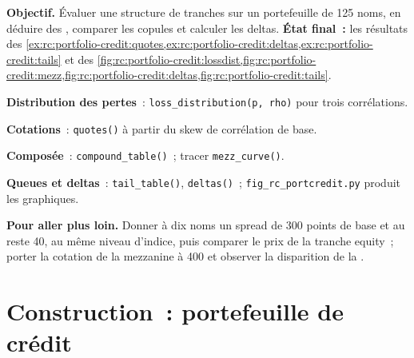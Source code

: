 \begin{tutorial}
\textbf{Objectif.} Évaluer une structure de tranches sur un portefeuille de 125 noms, en déduire des
, comparer les copules et calculer les deltas. \textbf{État final~:} les résultats
des \cref{ex:rc:portfolio-credit:quotes,ex:rc:portfolio-credit:deltas,ex:rc:portfolio-credit:tails} et
des \cref{fig:rc:portfolio-credit:lossdist,fig:rc:portfolio-credit:mezz,fig:rc:portfolio-credit:deltas,fig:rc:portfolio-credit:tails}.
\begin{tutsteps}
\item \textbf{Distribution des pertes}~: \texttt{loss\_distribution(p, rho)} pour trois
corrélations.
\item \textbf{Cotations}~: \texttt{quotes()} à partir du skew de corrélation de base.
\item \textbf{Composée}~: \texttt{compound\_table()}~; tracer \texttt{mezz\_curve()}.
\item \textbf{Queues et deltas}~: \texttt{tail\_table()}, \texttt{deltas()}~;
\texttt{fig\_rc\_portcredit.py} produit les graphiques.
\end{tutsteps}
\textbf{Pour aller plus loin.} Donner à dix noms un spread de 300 points de base et au reste 40,
au même niveau d'indice, puis comparer le prix de la tranche equity~; porter la cotation de la mezzanine
à 400 et observer la disparition de la .
\end{tutorial}

\section{Construction~: portefeuille de crédit}\label{bld:rc:portfolio-credit:portcredit}

